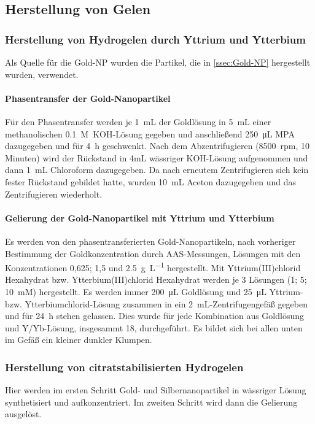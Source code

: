 	\subsection{Herstellung von Gelen}
		
		\subsubsection{Herstellung von Hydrogelen durch Yttrium und Ytterbium}
		
			Als Quelle für die Gold-NP wurden die Partikel, die in \cref{ssec:Gold-NP} hergestellt wurden, verwendet.
			
			\paragraph{Phasentransfer der Gold-Nanopartikel}
		
			Für den Phasentransfer werden je \SI{1}{\milli\liter} der Goldlösung in \SI{5}{\milli\liter} einer methanolischen \SI{0,1}{M}~KOH-Lösung gegeben und anschließend \SI{250}{\micro\liter} MPA dazugegeben und für \SI{4}{\hour} geschwenkt.
			Nach dem Abzentrifugieren (8500~rpm, 10 Minuten) wird der Rückstand in 4mL wässriger KOH-Lösung aufgenommen und dann \SI{1}{\milli\liter} Chloroform dazugegeben. 
			Da nach erneutem Zentrifugieren sich kein fester Rückstand gebildet hatte, wurden \SI{10}{\milli\liter} Aceton dazugegeben und das Zentrifugieren wiederholt.
				
			\paragraph{Gelierung der Gold-Nanopartikel mit Yttrium und Ytterbium}
				
			Es werden von den phasentransferierten Gold-Nanopartikeln, nach vorheriger Bestimmung der Goldkonzentration durch AAS-Messungen, Lösungen mit den Konzentrationen 0,625; 1,5 und \SI{2,5}{\gram\per\liter} hergestellt.
			Mit Yttrium(III)chlorid Hexahydrat bzw. Ytterbium(III)chlorid Hexahydrat werden je 3 Lösungen (1; 5; \SI{10}{mM}) hergestellt.
			Es werden immer \SI{200}{\micro\liter} Goldlösung und \SI{25}{\micro\liter} Yttrium- bzw. Ytterbiumchlorid-Lösung zusammen in ein \SI{2}{\milli\liter}-Zentrifugengefäß gegeben und für \SI{24}{\hour} stehen gelassen.
			Dies wurde für jede Kombination aus Goldlösung und Y/Yb-Lösung, insgesammt 18, durchgeführt.
			Es bildet sich bei allen unten im Gefäß ein kleiner dunkler Klumpen.
			  
		\subsubsection{Herstellung von citratstabilisierten Hydrogelen}
			Hier werden im ersten Schritt Gold- und Silbernanopartikel in wässriger Lösung synthetisiert und aufkonzentriert.
			Im zweiten Schritt wird dann die Gelierung ausgelöst. \autocite{Bigall2009} 
		 
